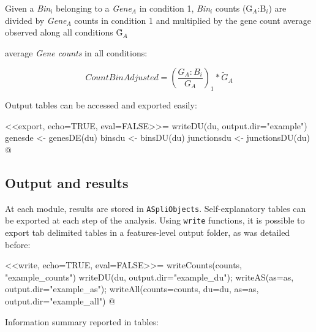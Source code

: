 \documentclass{article}
\begin{document}
Given a \textit{Bin$_i$} belonging to a \textit{Gene$_A$} in condition 1, \textit{Bin$_i$} counts ({G$_A$:B$_i$}) are divided by \textit{Gene$_A$} counts in condition 1 and multiplied by the gene count  average observed along all conditions \~G$_A$

average \textit{Gene counts} in all conditions:

	\[ CountBinAdjusted=(\frac{G_A:B_i}{G_A})_1 * \tilde G_A \]


Output tables can be accessed and exported easily:
 
<<export, echo=TRUE, eval=FALSE>>=
writeDU(du, output.dir="example")
genesde <- genesDE(du)
binsdu <- binsDU(du)
junctionsdu <- junctionsDU(du)
@

\subsection{Output and results}
At each module, results are stored in \texttt{ASpliObjects}. Self-explanatory tables can be exported at each step of the analysis. Using \texttt{write} functions, it is possible to export tab delimited tables in a features-level output folder, as was detailed before:

<<write, echo=TRUE, eval=FALSE>>=
writeCounts(counts, "example_counts")
writeDU(du, output.dir="example_du");
writeAS(as=as, output.dir="example_as");
writeAll(counts=counts, du=du, as=as, output.dir="example_all")
@

Information summary reported in tables:
\end{document}
